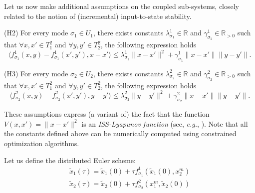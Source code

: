 %


Let us now make additional assumptions on the coupled sub-systems,
closely related to the notion of (incremental) input-to-state
stability.

(H2) For every mode $\sigma_1 \in U_1$, there exists constants
$\lambda^1_{\sigma_1} \in \mathbb{R}$ and $\gamma^1_{\sigma_1} \in
\mathbb{R}_{>0}$ such that $\forall x,x' \in T_1^2$ and $\forall y,y'
\in T_2^2 $, the following expression holds
$$ \langle f_{\sigma_1}^1 (x,y) - f_{\sigma_1}^1 (x',y'), x - x' \rangle \leq \lambda^1_{\sigma_1} \| x - x' \|^2 + \gamma^1_{\sigma_1} \| x - x' \| \| y - y' \|. $$


(H3) For every mode $\sigma_2 \in U_2$, there exists constants
$\lambda^2_{\sigma_2} \in \mathbb{R}$ and $\gamma^2_{\sigma_2} \in
\mathbb{R}_{>0}$ such that $\forall x,x' \in T_1^2$ and $\forall y,y'
\in T_2^2 $, the following expression holds $$ \langle f_{\sigma_2}^2
(x,y) - f_{\sigma_2}^2 (x',y'), y - y' \rangle \leq
\lambda^2_{\sigma_2} \| y - y' \|^2 + \gamma^2_{\sigma_2} \| x - x' \|
\| y - y' \|. $$
%

These assumptions express (a variant of) the fact that the function
$V(x,x')=\|x-x'\|^2$ is an {\em ISS-Lyapunov function} (see,
\textit{e.g.}, \cite{angeli2000lyapunov,hespanha2008lyapunov}).  Note
that all the constants defined above can be numerically computed using
constrained optimization algorithms.

Let us define the distributed Euler scheme:
\begin{eqnarray}
 \tilde x_1(\tau) = \tilde x_1(0) + \tau f_{\sigma_1}^1(\tilde x_1(0),x_2^m)
 \\
 \tilde x_2(\tau) = \tilde x_2(0) + \tau f_{\sigma_2}^2 ( x_1^m,\tilde x_2(0))
\end{eqnarray}

